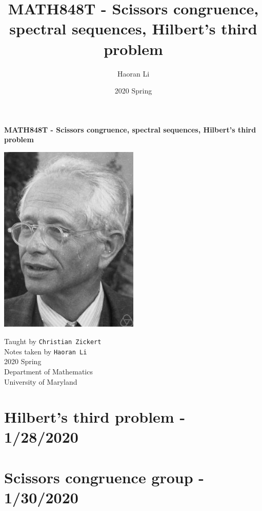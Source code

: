 \documentclass[a4paper,10pt]{article}
\title{MATH848T - Scissors congruence, spectral sequences, Hilbert's third problem}
\author{Haoran Li}
\date{2020 Spring}
\begin{document}
\sloppy %

\begin{titlepage}
\begin{center}
\vspace*{1cm}
\LARGE
\textbf{MATH848T - Scissors congruence, spectral sequences, Hilbert's third problem} \\
\vspace{2cm}
\begin{center}
\includegraphics[width=0.5\textwidth]{Pictures/Max_Dehn.jpg}
\end{center}
\vspace{2cm}
\normalsize
Taught by \texttt{Christian Zickert} \\
Notes taken by \texttt{Haoran Li} \\
2020 Spring \\
\vspace{2cm}
Department of Mathematics\\
University of Maryland\\
\end{center}
\end{titlepage}

\tableofcontents
\newpage

\section{Hilbert's third problem - 1/28/2020}

\newpage

\section{Scissors congruence group - 1/30/2020}

\newpage
\end{document}
